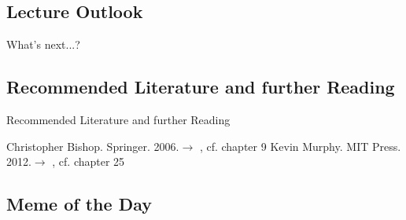\subsection{Lecture Outlook}

\begin{frame}{What's next...?}{}
\end{frame}


\subsection{Recommended Literature and further Reading}

\begin{frame}[allowframebreaks]{Recommended Literature and further Reading}{}
	\footnotesize
	\begin{thebibliography}{2}
			{Christopher Bishop. Springer. 2006.}{$\rightarrow$ \href{
				http://users.isr.ist.utl.pt/~wurmd/Livros/school/Bishop\%20-\%20Pattern\%20Recognition\%20And\%20Machine\%20Learning\%20-\%20Springer\%20\%202006.pdf
			}{}, cf. chapter 9}
			{Kevin Murphy. MIT Press. 2012.}{$\rightarrow$ \href{
				https://doc.lagout.org/science/Artificial\%20Intelligence/Machine\%20learning/Machine\%20Learning_\%20A\%20Probabilistic\%20Perspective\%20\%5BMurphy\%202012-08-24\%5D.pdf
			}{}, cf. chapter 25}	
	\end{thebibliography}
\end{frame}


\subsection{Meme of the Day}

